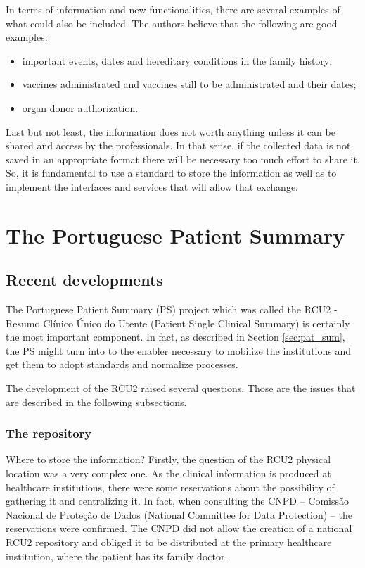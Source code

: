 In terms of information and new functionalities, there are several examples of what could also be included. The authors believe that the following are good examples:
\begin{itemize}
\item important events, dates and hereditary conditions in the family history;
\item vaccines administrated and vaccines still to be administrated and their dates;
\item organ donor authorization.
\end{itemize}


Last but not least, the information does not worth anything unless it can be shared and access by the professionals. In that sense, if the collected data is not saved in an appropriate format there will be necessary too much effort to share it. So, it is fundamental to use a standard to store the information as well as to implement the interfaces and services that will allow that exchange.



\section{The Portuguese Patient Summary}

\subsection{Recent developments}

The Portuguese Patient Summary (PS) project which was called the RCU2 - Resumo Clínico Único do Utente (Patient Single Clinical Summary) is certainly the most important component. In fact, as described in Section \ref{sec:pat_sum}, the PS might turn into to the enabler necessary to mobilize the institutions and get them to adopt standards and normalize processes.

The development of the RCU2 raised several questions. Those are the issues that are described in the following subsections.

\subsubsection{The repository}

Where to store the information? Firstly, the question of the RCU2 physical location was a very complex one. As the clinical information is produced at healthcare institutions, there were some reservations about the possibility of gathering it and centralizing it. In fact, when consulting the CNPD -- Comissão Nacional de Proteção de Dados (National Committee for Data Protection) -- the reservations were confirmed. The CNPD did not allow the creation of a national RCU2 repository and obliged it to be distributed at the primary healthcare institution, where the patient has its family doctor.

